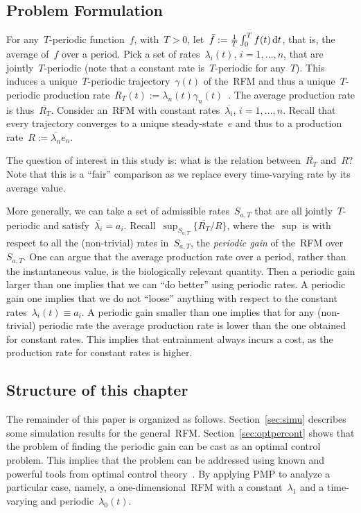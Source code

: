 \subsection{Problem Formulation}\label{sec:probform}

For any~$T$-periodic function~$f$, with~$T>0$, let~$\bar f:=\frac{1}{T}\int_0^T f(t)\mathop{}\!\mathrm{d} t $, that is, the average of~$f$ over  a period. 
Pick a set of rates~$\lambda_i(t)$, $i=1,\dots,n$, that are jointly~$T$-periodic (note that a constant rate is~$T$-periodic for any~$T$). 
This induces a unique~$T$-periodic trajectory~$\gamma(t)$ of the~\ac{RFM} and thus a unique~$T$-periodic production rate~$R_T(t):=\lambda_n(t) \gamma_n(t)$~\cite{entrainment}. 
The average production rate is thus~$\overline {R_T}$. 
Consider an~\ac{RFM} with constant rates~$\overline { \lambda_i } $, $i=1,\dots,n$. 
Recall that every trajectory converges to a unique steady-state~$e$
and thus to a production rate~$R:=\overline { \lambda_n } e_n$. 

The question of interest in this study is: what is the relation between~$\overline {R_T}$ and~$R$?
Note that this is a ``fair'' comparison as we replace every time-varying rate by its average value. 

More generally, we can take a set of admissible rates~$S_{a,T}$ that are all jointly~$T$-periodic and satisfy~$\overline{\lambda_i}=a_i$.
Recall~$\sup_{S_{a,T}}  \{\overline {R_T}/R\}$, where the~$\sup$ is with respect to all the (non-trivial) rates in~$S_{a,T}$,  the \emph{periodic gain} of the~\ac{RFM}  over~$S_{a,T}$.
One can argue that the average production rate over a period, rather than the instantaneous  value, is the biologically relevant quantity.  
Then a periodic gain larger than one implies that we can ``do better'' using periodic rates. 
A periodic gain one implies that we do not ``loose'' anything with respect to the constant rates~$\lambda_i(t)\equiv a_i$.
A periodic gain smaller than one implies that for any (non-trivial) periodic rate the average production rate is lower than the one obtained for constant rates. 
This implies that entrainment  always incurs a cost, as the production rate for constant rates  is higher. 


\subsection{Structure of this chapter}
The remainder of this paper is organized as follows. 
Section~\ref{sec:simu} describes some simulation results for the general~\ac{RFM}.
Section~\ref{sec:optpercont} shows that the problem of finding the periodic gain can be cast as an optimal control problem. 
This implies that the  problem can be addressed using known and powerful tools from optimal control theory~\cite{pontryagin,LeeMarkus,liberzon}. 
By applying \ac{PMP} to analyze a particular case, namely, a one-dimensional~\ac{RFM} with a constant~$\lambda_1$ and a time-varying and periodic~$\lambda_0(t)$. 

